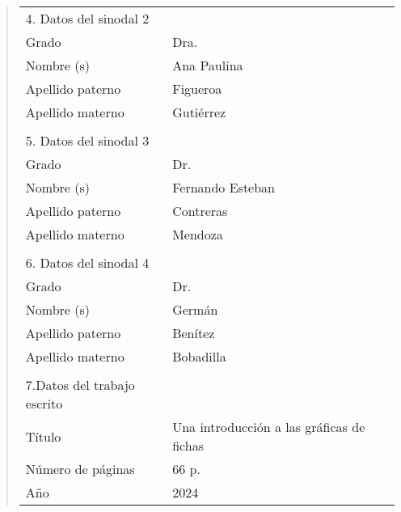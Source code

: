 {\begin{quote}
\begin{tabular}{lll}
4. Datos del sinodal 2      & {}                                          \\
Grado                       & Dra.                                          \\
Nombre (s)                   & Ana Paulina                                     \\
Apellido paterno            & Figueroa                                     \\
Apellido materno            & Guti\'errez                                 \\
{}                          & {}                                          \\
5. Datos del sinodal 3      & {}                                          \\
Grado                       & Dr.                                        \\
Nombre (s)                   & Fernando Esteban                           \\
Apellido paterno            & Contreras                                     \\
Apellido materno            & Mendoza                                     \\
{}                          & {}                                          \\
6. Datos del sinodal 4      & {}                                          \\
Grado                       & Dr.                                          \\
Nombre (s)                   & Germ\'an                                     \\
Apellido paterno            & Ben\'itez                                     \\
Apellido materno            & Bobadilla                                     \\
{}                          & {}                                          \\
7.Datos del trabajo escrito & {}                                          \\
T\'itulo                    & Una introducci\'on a las gr\'aficas de fichas  \\
N\'umero de p\'aginas       & 66 p.                                       \\
A\~no                       & 2024                                        \\
\end{tabular}
\end{quote}
}

